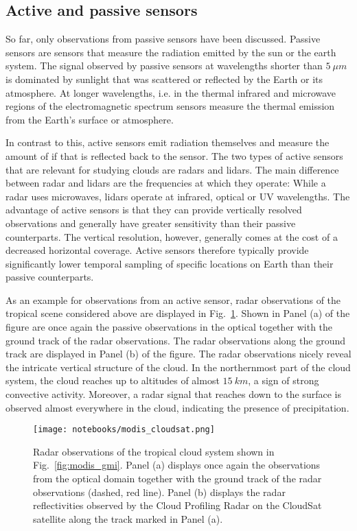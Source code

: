 \subsection{Active and passive sensors}

So far, only observations from passive sensors have been discussed. Passive
sensors are sensors that measure the radiation emitted by the sun or the earth
system. The signal observed by passive sensors at wavelengths shorter than
$5\ \unit{\mu m}$ is dominated by sunlight that was scattered or reflected by
the Earth or its atmosphere. At longer wavelengths, i.e. in the thermal infrared
and microwave regions of the electromagnetic spectrum sensors measure the
thermal emission from the Earth's surface or atmosphere.

In contrast to this, active sensors emit radiation themselves and measure the
amount of if that is reflected back to the sensor. The two types of active
sensors that are relevant for studying clouds are radars and lidars. The main
difference between radar and lidars are the frequencies at which they operate:
While a radar uses microwaves, lidars operate at infrared, optical or UV
wavelengths. The advantage of active sensors is that they can provide vertically
resolved observations and generally have greater sensitivity than their passive
counterparts. The vertical resolution, however, generally comes at the cost of a
decreased horizontal coverage. Active sensors therefore typically provide significantly
lower temporal sampling of specific locations on Earth than their passive counterparts.

As an example for observations from an active sensor, radar observations of the
tropical scene considered above are displayed in Fig.~\ref{fig:modis_cloudsat}.
Shown in Panel (a) of the figure are once again the passive observations in the
optical together with the ground track of the radar observations. The radar
observations along the ground track are displayed in Panel (b) of the figure.
The radar observations nicely reveal the intricate vertical structure of the
cloud. In the northernmost part of the cloud system, the cloud reaches up to
altitudes of almost $15\ \unit{km}$, a sign of strong convective activity.
Moreover, a radar signal that reaches down to the surface is observed almost
everywhere in the cloud, indicating the presence of precipitation.

\begin{figure}
\texttt{[image: notebooks/modis\_cloudsat.png]}
\caption{Radar observations of the tropical cloud system shown in
  Fig.~\ref{fig:modis_gmi}. Panel (a) displays once again the observations from
  the optical domain together with the ground track of the radar observations
  (dashed, red line). Panel (b) displays the radar reflectivities observed by
  the Cloud Profiling Radar on the CloudSat satellite \cite{tanelli08} along the
  track marked in Panel (a).}
\label{fig:modis_cloudsat}
\end{figure}
